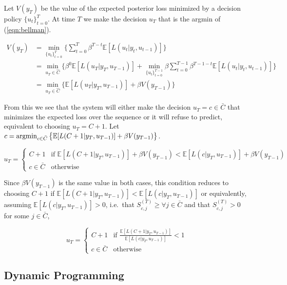 \documentclass[12pt,solutions]{article}
\newcommand{\argmin}{\operatornamewithlimits{argmin}}
\newcommand{\E}{\mathbb{E}}
\begin{document}

Let $V(y_T)$ be the value of the expected posterior loss minimized by a decision policy $\{u_t\}_{t=0}^{T}$. At time $T$ we make the decision $u_T$ that is the argmin of (\ref{eqn:bellman}).

\begin{align}
V(y_T) &= \min_{\{u_t\}_{t=0}^{T}} \Big\{ \sum_{t=0}^T \beta^{T-t}\E[L(u_t|y_t, u_{t-1})] \Big\}\\
&= \min_{u_T \in \hat{C}} \Big\{  \beta^{0}\E[L(u_T|y_T, u_{T-1})] + \min_{\{u_t\}_{t=0}^{T-1}} \beta \sum_{t=0}^{T-1} \beta^{T-1-t}\E[L(u_t|y_t, u_{t-1})] \Big\}\\
&= \min_{u_T \in \hat{C}} \Big\{  \E[L(u_T|y_T, u_{T-1})] + \beta V(y_{T-1})\Big\} \label{eqn:bellman}
\end{align}

From this we see that the system will either make the decision $u_T = c \in \bar{C}$ that minimizes the expected loss over the sequence or it will refuse to predict, equivalent to choosing $u_T = C+1$. Let $c = \argmin_{c\in \bar{C}} \big\{ \E[L(C+1|y_T, u_{T-1})] + \beta V(y_{T-1})\big\}$.

\begin{equation}
u_T = 
\begin{cases}
C+1 &  \text{if } \E[L(C+1|y_T, u_{T-1})] + \beta V(y_{T-1}) <   \E[L(c|y_T, u_{T-1})] + \beta V(y_{T-1})\\
c \in \bar{C} & \text{otherwise}
\end{cases}
\end{equation}

Since $ \beta V(y_{T-1})$ is the same value in both cases, this condition reduces to choosing $C+1$ if  $\E[L(C+1|y_T, u_{T-1})] <   \E[L(c|y_T, u_{T-1})] $ or equivalently, assuming $ \E[L(c|y_T, u_{T-1})]  > 0$, i.e.\ that $S^{(T)}_{c,j} \geq \forall j \in \bar{C}$ and that $ S^{(T)}_{c,j}  >0 $ for some $j \in \bar{C}$,

\begin{equation}
u_T = 
\begin{cases}
C+1 &  \text{if } \frac{\E[L(C+1|y_T, u_{T-1})]}{\E[L(c|y_T, u_{T-1})]} < 1\\
c \in \bar{C} & \text{otherwise}
\end{cases}
\end{equation}


\subsection{Dynamic Programming}
\end{document}

